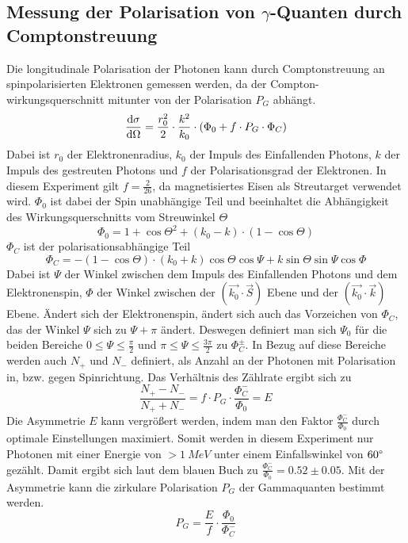 \subsection{Messung der Polarisation von $\gamma$-Quanten durch Comptonstreuung}
Die longitudinale Polarisation der Photonen kann durch Comptonstreuung an spinpolarisierten Elektronen gemessen werden, da der Compton-wirkungsquerschnitt mitunter von der Polarisation $P_G$ abhängt. 
$$\odv{\sigma}{\Omega} = \frac{r_0^2}{2} \cdot \frac{k^2}{k_0} \cdot (\Phi_0 + f \cdot P_G \cdot \Phi_C)  $$
Dabei ist $r_0$ der Elektronenradius, $k_0$ der Impuls des Einfallenden Photons, $k$ der Impuls des gestreuten Photons und $f$ der Polarisationsgrad der Elektronen. In diesem Experiment gilt $f = \frac{2}{26}$, da magnetisiertes Eisen als Streutarget verwendet wird. 
$\Phi_0$ ist dabei der Spin unabhängige Teil und beeinhaltet die Abhängigkeit des Wirkungsquerschnitts vom Streuwinkel $\Theta$
$$\Phi_0 = 1 + \cos{\Theta}^2 + (k_0 - k)\cdot (1-\cos{\Theta})$$
$\Phi_C$ ist der polarisationsabhängige Teil
$$\Phi_C = -(1 -\cos{\Theta}) \cdot (k_0 + k) \cos{\Theta} \cos{\Psi}+ k \sin{\Theta} \sin{\Psi} \cos{\Phi}$$ 
Dabei ist $\Psi$ der Winkel zwischen dem Impuls des Einfallenden Photons und dem Elektronenspin, $\Phi$ der Winkel zwischen der $(\Vec{k_0}\cdot\Vec{S})$ Ebene und der $(\Vec{k_0}\cdot\Vec{k})$ Ebene.
Ändert sich der Elektronenspin, ändert sich auch das Vorzeichen von $\Phi_C$, das der Winkel $\Psi$ sich zu $\Psi + \pi$ ändert. Deswegen definiert man sich $\Psi_0$ für die beiden Bereiche $0 \leq \Psi \leq \frac{\pi}{2}$ und $\pi \leq \Psi \leq \frac{3\pi}{2}$ zu $\Phi_C^\pm$. In Bezug auf diese Bereiche werden auch $N_+$ und $N_-$ definiert, als Anzahl an der Photonen mit Polarisation in, bzw. gegen Spinrichtung. Das Verhältnis des Zählrate ergibt sich zu 
\begin{equation}
    \frac{N_+ - N_-}{N_+ + N_-} = f \cdot P_G \cdot \frac{\Phi_C^-}{\Phi_0} = E
    \label{Asymmetrie}
\end{equation}
Die Asymmetrie $E$ kann vergrößert werden, indem man den Faktor $\frac{\Phi_C^-}{\Phi_0}$ durch optimale Einstellungen maximiert. Somit werden in diesem Experiment nur Photonen mit einer Energie von $> \SI{1}{MeV}$ unter einem Einfallswinkel von $60 \degree$ gezählt. Damit ergibt sich laut dem blauen Buch zu $\frac{\Phi_C^-}{\Phi_0} = 0.52 \pm 0.05$. \cite{BlueBook} 
Mit der Asymmetrie kann die zirkulare Polarisation $P_G$ der Gammaquanten bestimmt werden. 
\begin{equation}
    P_G = \frac{E}{f}\cdot \frac{\Phi_0}{\Phi_C^-}
    \label{Polarisation}
\end{equation}
